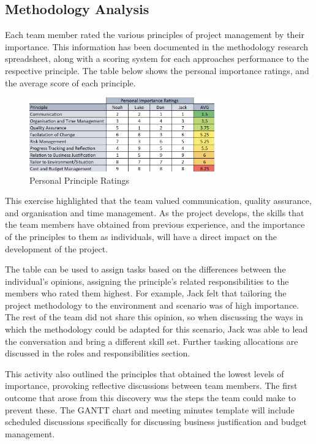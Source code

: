 \documentclass [12pt]{article}
\begin{document}
\subsection{Methodology Analysis}\label{sec:methodology_analysis}
Each team member rated the various principles of project management by their importance. This information has been documented in the methodology research spreadsheet, along with a scoring system for each approaches performance to the respective principle. The table below shows the personal importance ratings, and the average score of each principle.

\begin{figure}[h]
    \centering
    \includegraphics[width = 8cm]{PersonalPrincipleRatings.png}
    \caption{Personal Principle Ratings}
\end{figure}

This exercise highlighted that the team valued communication, quality assurance, and organisation and time management. As the project develops, the skills that the team members have obtained from previous experience, and the importance of the principles to them as individuals, will have a direct impact on the development of the project.

The table can be used to assign tasks based on the differences between the individual's opinions, assigning the principle's related responsibilities to the members who rated them highest. For example, Jack felt that tailoring the project methodology to the environment and scenario was of high importance. The rest of the team did not share this opinion, so when discussing the ways in which the methodology could be adapted for this scenario, Jack was able to lead the conversation and bring a different skill set. Further tasking allocations are discussed in the roles and responsibilities section.

This activity also outlined the principles that obtained the lowest levels of importance, provoking reflective discussions between team members. The first outcome that arose from this discovery was the steps the team could make to prevent these. The GANTT chart and meeting minutes template will include scheduled discussions specifically for discussing business justification and budget management.
\end{document}
